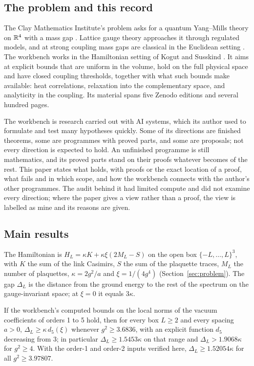 \subsection*{The problem and this record}

The Clay Mathematics Institute's problem asks for a quantum Yang--Mills theory on $\mathbb{R}^4$ with a mass gap \cite{JaffeWitten}. Lattice gauge theory approaches it through regulated models, and at strong coupling mass gaps are classical in the Euclidean setting \cite{OsterwalderSeiler}. The workbench works in the Hamiltonian setting of Kogut and Susskind \cite{KogutSusskind}. It aims at explicit bounds that are uniform in the volume, hold on the full physical space and have closed coupling thresholds, together with what such bounds make available: heat correlations, relaxation into the complementary space, and analyticity in the coupling. Its material spans five Zenodo editions and several hundred pages.

The workbench is research carried out with AI systems, which its author used to formulate and test many hypotheses quickly. Some of its directions are finished theorems, some are programmes with proved parts, and some are proposals; not every direction is expected to hold. An unfinished programme is still mathematics, and its proved parts stand on their proofs whatever becomes of the rest. This paper states what holds, with proofs or the exact location of a proof, what fails and in which scope, and how the workbench connects with the author's other programmes. The audit behind it had limited compute and did not examine every direction; where the paper gives a view rather than a proof, the view is labelled as mine and its reasons are given.

\subsection*{Main results}

The Hamiltonian is $H_L=\kappa K+\kappa\xi(2M_L-S)$ on the open box $\{-L,\dots,L\}^3$, with $K$ the sum of the link Casimirs, $S$ the sum of the plaquette traces, $M_L$ the number of plaquettes, $\kappa=2g^2/a$ and $\xi=1/(4g^4)$ (Section~\ref{sec:problem}). The gap $\Delta_L$ is the distance from the ground energy to the rest of the spectrum on the gauge-invariant space; at $\xi=0$ it equals $3\kappa$.

\begin{introthm}
If the workbench's computed bounds on the local norms of the vacuum coefficients of orders 1 to 5 hold, then for every box $L\ge2$ and every spacing $a>0$, $\Delta_L\ge\kappa\,d_5(\xi)$ whenever $g^2\ge3.6836$, with an explicit function $d_5$ decreasing from $3$; in particular $\Delta_L\ge1.5453\kappa$ on that range and $\Delta_L>1.9068\kappa$ for $g^2\ge4$. With the order-1 and order-2 inputs verified here, $\Delta_L\ge1.52054\kappa$ for all $g^2\ge3.97807$.
\end{introthm}

